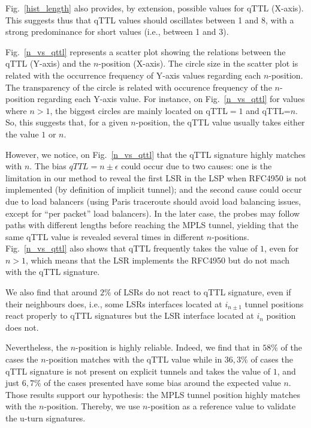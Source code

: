 Fig.~\ref{hist_length} also provides, by extension, possible values for qTTL
(X-axis).  This suggests thus that qTTL values should oscillates between 1 and
8, with a strong predominance for short values (i.e., between 1 and 3). 

Fig.~\ref{n_vs_qttl} represents a scatter plot showing the relations between the
qTTL (Y-axis) and the $n$-position (X-axis).  The circle size in the scatter
plot is related with the occurrence frequency of Y-axis values regarding each
$n$-position.  The transparency of the circle is related with occurence
frequency of the $n$-position regarding each Y-axis value.  For instance, on
Fig.~\ref{n_vs_qttl} for values where $n>1$, the biggest circles are mainly
located on qTTL$=1$ and qTTL=$n$.  So, this suggests that, for a given
$n$-position, the qTTL value usually takes either the value $1$ or $n$.

However, we notice, on Fig.~\ref{n_vs_qttl} that the qTTL signature highly
matches with $n$.   The bias $\textit{qTTL}=n \pm \epsilon$ could occur due to
two causes: one is the limitation in our method to reveal the first LSR in the
LSP when RFC4950 is not implemented (by definition of implicit tunnel); and the
second cause could occur due to load balancers (using Paris traceroute should
avoid load balancing issues, except for ``per packet'' load balancers).
In the later case, the \traceroute probes may follow paths with different
lengths before reaching the MPLS tunnel, yielding that the same qTTL value is
revealed several times in different $n$-positions. Fig.~\ref{n_vs_qttl} also
shows that qTTL frequently takes the value of $1$, even for $n>1$, which means
that the LSR implements the RFC4950 but do not mach with the qTTL signature.


We also find that around $2\%$ of LSRs do not react to qTTL signature, even
if their neighbours does, i.e., some LSRs interfaces located at
$i_{n \pm 1}$ tunnel positions react properly to qTTL signatures but the LSR
interface located at $i_n$ position does not.


Nevertheless, the $n$-position is highly reliable. Indeed, we find that in
$58\%$ of the cases the $n$-position matches with the qTTL value while in
$36,3\%$ of cases the qTTL signature is not present on explicit tunnels and takes the value of $1$,
and just $6,7\%$ of the cases presented have some bias around the expected value
$n$. Those results support our hypothesis: the  MPLS tunnel position highly
matches with the $n$-position. Thereby,  we use $n$-position as a reference
value to validate the u-turn signatures.

